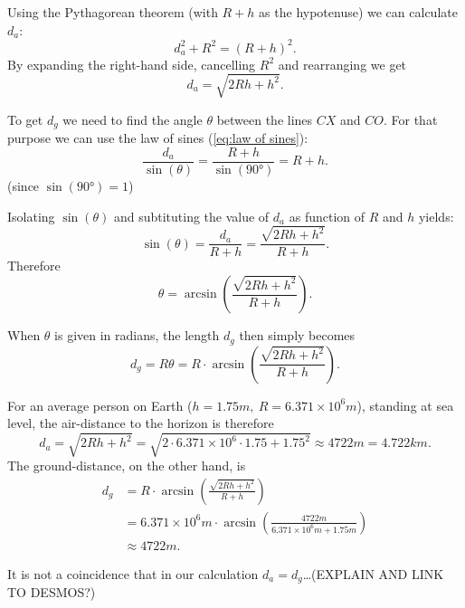 \begin{enumerate}
	Using the Pythagorean theorem (with $R+h$ as the hypotenuse) we can calculate $d_{a}$:
	\[
		d_{a}^{2} + R^{2} = \left( R+h \right)^{2}.
	\]
	By expanding the right-hand side, cancelling $R^{2}$ and rearranging we get
	\[
		d_{a} = \sqrt{2Rh+h^{2}}.
	\]

	To get $d_{g}$ we need to find the angle $\theta$ between the lines $CX$ and $CO$. For that purpose we can use the law of sines (\autoref{eq:law of sines}):
	\[
		\frac{d_{a}}{\sin(\theta)} = \frac{R+h}{\sin(\ang{90})} = R+h.
	\]
	(since $\sin(\ang{90})=1$)

	Isolating $\sin(\theta)$ and subtituting the value of $d_{a}$ as function of $R$ and $h$ yields:
	\[
		\sin(\theta) = \frac{d_{a}}{R+h} = \frac{\sqrt{2Rh+h^{2}}}{R+h}.
	\]
	Therefore
	\[
		\theta = \arcsin \left( \frac{\sqrt{2Rh+h^{2}}}{R+h} \right).
	\]

	When $\theta$ is given in radians, the length $d_{g}$ then simply becomes
	\[
		d_{g} = R\theta = R\cdot\arcsin \left( \frac{\sqrt{2Rh+h^{2}}}{R+h} \right).
	\]

	For an average person on Earth ($h=1.75\si{m},\ R=6.371\times10^{6}\si{m}$), standing at sea level, the air-distance to the horizon is therefore
	\[
		d_{a} = \sqrt{2Rh+h^{2}} = \sqrt{2\cdot6.371\times10^{6}\cdot1.75+1.75^{2}} \approx 4722\si{m} = 4.722\si{km}.
	\]
	The ground-distance, on the other hand, is
	\begin{align*}
		d_{g} &= R\cdot\arcsin \left( \frac{\sqrt{2Rh+h^{2}}}{R+h} \right)\\
			  &= 6.371\times10^{6}\si{m} \cdot \arcsin \left( \frac{4722\si{m}}{6.371\times10^{6}\si{m}+1.75\si{m}} \right)\\
			  &\approx 4722\si{m}.
	\end{align*}
	
	It is not a coincidence that in our calculation $d_{a}=d_{g}$\ldots (EXPLAIN AND LINK TO DESMOS?)
\end{enumerate}
